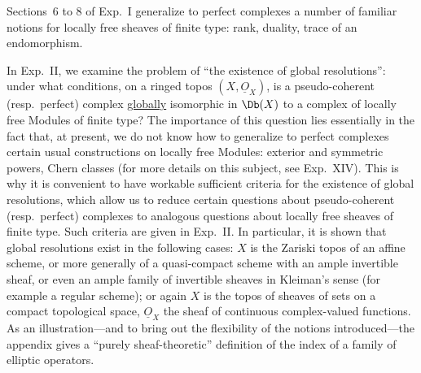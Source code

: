 Sections~6 to 8 of Exp.\ I generalize to perfect complexes a number of familiar notions for locally free sheaves of finite type: rank, duality, trace of an endomorphism.

In Exp.\ II, we examine the problem of ``the existence of global resolutions'': under what conditions, on a ringed topos \((X,\underline{O}_X)\), is a pseudo-coherent (resp.\ perfect) complex \uline{globally} isomorphic in \(\Db(X)\) to a complex of locally free Modules of finite type? The importance of this question lies essentially in the fact that, at present, we do not know how to generalize to perfect complexes certain usual constructions on locally free Modules: exterior and symmetric powers, Chern classes (for more details on this subject, see Exp.\ XIV). This is why it is convenient to have workable sufficient criteria for the existence of global resolutions, which allow us to reduce certain questions about pseudo-coherent (resp.\ perfect) complexes to analogous questions about locally free sheaves of finite type. Such criteria
%
are given in Exp.\ II. In particular, it is shown that global resolutions exist in the following cases: \(X\) is the Zariski topos of an affine scheme, or more generally of a quasi-compact scheme with an ample invertible sheaf, or even an ample family of invertible sheaves in Kleiman's sense (for example a regular scheme); or again \(X\) is the topos of sheaves of sets on a compact topological space, \(\underline{O}_X\) the sheaf of continuous complex-valued functions. As an illustration---and to bring out the flexibility of the notions introduced---the appendix gives a ``purely sheaf-theoretic'' definition of the index of a family of elliptic operators.

